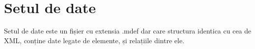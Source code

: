 \newpage
\section{Setul de date}

Setul de date este un fișier cu extensia .mdef dar care structura identica cu cea de XML, 
conține date legate de elemente, și relațiile dintre ele.